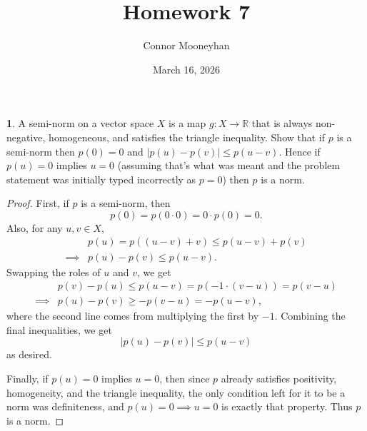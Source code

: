 \documentclass[12pt]{article}
\title{Homework 7}
\author{Connor Mooneyhan}
\date{March 16, 2026}
\theoremstyle{definition}
\newtheorem{ex}{}
\begin{document}
\maketitle

\begin{ex}
	A semi-norm on a vector space $X$ is a map $g : X \to \mathbb{R}$ that is always non-negative, homogeneous, and satisfies the triangle inequality.
	Show that if $p$ is a semi-norm then $p(0) = 0$ and $|p(u) - p(v)| \leq p(u-v)$.
	Hence if $p(u) = 0$ implies $u = 0$ (assuming that's what was meant and the problem statement was initially typed incorrectly as $p = 0$) then $p$ is a norm.
\end{ex}
\begin{proof}
	First, if $p$ is a semi-norm, then \begin{equation*}
		p(0) = p(0 \cdot 0) = 0 \cdot p(0) = 0.
	\end{equation*}
	Also, for any $u, v \in X$, \begin{align*}
		         & p(u) = p((u - v) + v) \leq p(u - v) + p(v) \\
		\implies & p(u) - p(v) \leq p(u - v).
	\end{align*}
	Swapping the roles of $u$ and $v$, we get \begin{align*}
		         & p(v) - p(u) \leq p(u - v) = p(-1 \cdot (v - u)) = p(v - u) \\
		\implies & p(u) - p(v) \geq -p(v-u) = -p(u - v),
	\end{align*}
	where the second line comes from multiplying the first by $-1$.
	Combining the final inequalities, we get \begin{equation*}
		|p(u) - p(v)| \leq p(u - v)
	\end{equation*}
	as desired.

	Finally, if $p(u) = 0$ implies $u = 0$, then since $p$ already satisfies positivity, homogeneity, and the triangle inequality, the only condition left for it to be a norm was definiteness, and $p(u) = 0 \implies u = 0$ is exactly that property.
	Thus $p$ is a norm.
\end{proof}
\end{document}
